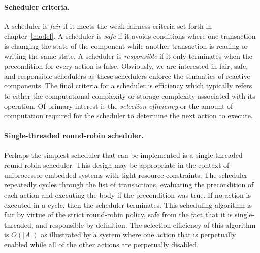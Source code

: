 \paragraph{Scheduler criteria.}
A scheduler is \emph{fair} if it meets the weak-fairness criteria set forth in chapter~\ref{model}.
A scheduler is \emph{safe} if it avoids conditions where one transaction is changing the state of the component while another transaction is reading or writing the same state.
A scheduler is \emph{responsible} if it only terminates when the precondition for every action is false.
Obviously, we are interested in fair, safe, and responsible schedulers as these schedulers enforce the semantics of reactive components.
The final criteria for a scheduler is efficiency which typically refers to either the computational complexity or storage complexity associated with its operation.
Of primary interest is the \emph{selection efficiency} or the amount of computation required for the scheduler to determine the next action to execute.

\paragraph{Single-threaded round-robin scheduler.}
Perhaps the simplest scheduler that can be implemented is a single-threaded round-robin scheduler.
This design may be appropriate in the context of uniprocessor embedded systems with tight resource constraints.
The scheduler repeatedly cycles through the list of transactions, evaluating the precondition of each action and executing the body if the precondition was true.
If no action is executed in a cycle, then the scheduler terminates.
This scheduling algorithm is fair by virtue of the strict round-robin policy, safe from the fact that it is single-threaded, and responsible by definition.
The selection efficiency of this algorithm is $O(|A|)$ as illustrated by a system where one action that is perpetually enabled while all of the other actions are perpetually disabled.

